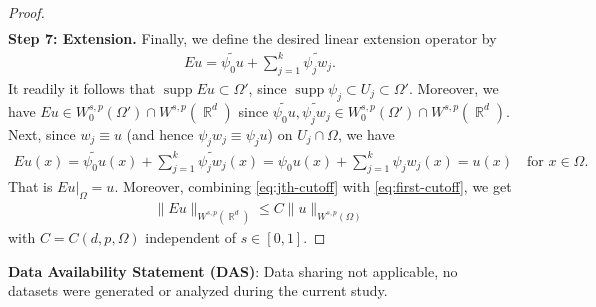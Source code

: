 \documentclass[12pt, reqno]{amsart}%
\theoremstyle{plain}  %
\theoremstyle{definition}  %
\theoremstyle{remark}
\numberwithin{equation}{section}
\DeclareMathOperator{\supp}{supp}
\DeclareMathOperator{\R}{\mathbb{R}}
\begin{document}
\begin{proof}
\begin{align}
\end{align}
\textbf{Step 7: Extension.} Finally, we define the desired linear extension operator by
\begin{align*}
Eu=\widetilde{\psi_0u}
+ \sum_{j=1}^k \widetilde{\psi_j w_j}.
\end{align*}
It readily it follows that $\supp Eu\subset \Omega'$, since $\supp \psi_j\subset U_j\subset \Omega'$. Moreover, we have $Eu \in W^{s,p}_0(\Omega')\cap W^{s,p}(\R^d)$  since $\widetilde{\psi_0 u}, \widetilde{\psi_jw_j}\in W^{s,p}_0(\Omega')\cap W^{s,p}(\R^d)$.  Next, since  $w_j\equiv u$ (and hence $\psi_jw_j\equiv \psi_ju$) on $U_j\cap \Omega$,  we have
\begin{align*}
 Eu(x)=\widetilde{\psi_0u}(x)+ \sum_{j=1}^k \widetilde{\psi_j w_j}(x)= \psi_0u(x)+ \sum_{j=1}^k \psi_j w_j(x)= u(x)\quad\text{for $x\in \Omega$}.
\end{align*}
That is $Eu|_{\Omega}= u$. Moreover, combining \eqref{eq:jth-cutoff} with \eqref{eq:first-cutoff}, we get
\begin{align*}
\|Eu\|_{W^{s,p}(\R^d)}  \leq  C \|u\|_{W^{s,p}(\Omega)}
\end{align*}
with  $C=C(d,p,\Omega)$ independent of $s\in [0,1]$.
\end{proof}


\vspace{1mm}
\noindent \textbf{Data Availability Statement (DAS)}: Data sharing not applicable, no datasets were generated or analyzed during the current study.
\end{document}
